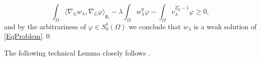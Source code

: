 \documentclass[11pt]{amsart}
\numberwithin{equation}{section} %
\theoremstyle{definition}
\def\G{\mathbb{G}}
\newcommand{\m}{\mbox}
\newcommand{\fine}{\qed\newline}
\begin{document}
\begin{equation}
	\int_\Omega\langle \nabla_\G w_\lambda,\nabla_\G\varphi\rangle_{\mathfrak{g}_{1}}-\lambda\int_\Omega w_\lambda^{q}\varphi
	-\int_\Omega v_\lambda^{2^\star_Q-1}\varphi\geq0,
\end{equation}
and by the arbitrariness of $\varphi \in S^1_0(\Omega)$ 
we conclude that $w_\lambda$
is a weak solution of \eqref{EqProblem}.\fine

\color{black}

The following technical Lemma closely follows \cite[Lemma 4.2]{BiGaVe}.
\end{document}
